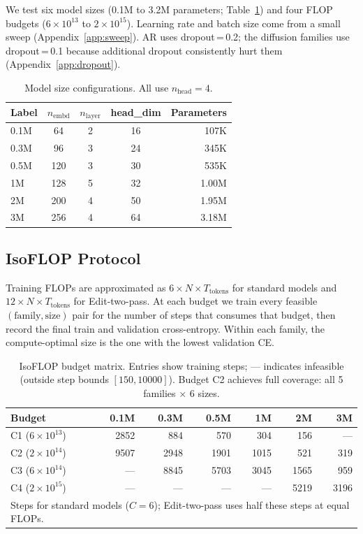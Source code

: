 \documentclass[11pt,a4paper]{article}
\begin{document}
We test six model sizes (0.1M to 3.2M parameters; Table~\ref{tab:sizes}) and four FLOP budgets ($6\!\times\!10^{13}$ to $2\!\times\!10^{15}$).
Learning rate and batch size come from a small sweep (Appendix~\ref{app:sweep}).
AR uses dropout\,=\,0.2; the diffusion families use dropout\,=\,0.1 because additional dropout consistently hurt them (Appendix~\ref{app:dropout}).

\begin{table}[H]
\centering
\caption{Model size configurations. All use $n_\text{head}=4$.}
\label{tab:sizes}
\begin{tabular}{lcccr}
\toprule
Label & $n_\text{embd}$ & $n_\text{layer}$ & head\_dim & Parameters \\
\midrule
0.1M & 64 & 2 & 16 & 107K \\
0.3M & 96 & 3 & 24 & 345K \\
0.5M & 120 & 3 & 30 & 535K \\
1M & 128 & 5 & 32 & 1.00M \\
2M & 200 & 4 & 50 & 1.95M \\
3M & 256 & 4 & 64 & 3.18M \\
\bottomrule
\end{tabular}
\end{table}

\subsection{IsoFLOP Protocol}

Training FLOPs are approximated as $6 \times N \times T_\text{tokens}$ for standard models and $12 \times N \times T_\text{tokens}$ for Edit-two-pass.
At each budget we train every feasible $(\text{family}, \text{size})$ pair for the number of steps that consumes that budget, then record the final train and validation cross-entropy.
Within each family, the compute-optimal size is the one with the lowest validation CE.

\begin{table}[H]
\centering
\caption{IsoFLOP budget matrix. Entries show training steps; --- indicates infeasible (outside step bounds $[150, 10000]$). Budget C2 achieves full coverage: all 5 families $\times$ 6 sizes.}
\label{tab:isoflop-matrix}
\begin{tabular}{lrrrrrr}
\toprule
Budget & 0.1M & 0.3M & 0.5M & 1M & 2M & 3M \\
\midrule
C1 ($6\!\times\!10^{13}$)  & 2852 & 884 & 570 & 304 & 156 & --- \\
C2 ($2\!\times\!10^{14}$)  & 9507 & 2948 & 1901 & 1015 & 521 & 319 \\
C3 ($6\!\times\!10^{14}$)  & --- & 8845 & 5703 & 3045 & 1565 & 959 \\
C4 ($2\!\times\!10^{15}$)  & --- & --- & --- & --- & 5219 & 3196 \\
\bottomrule
\multicolumn{7}{l}{\footnotesize Steps for standard models ($C\!=\!6$); Edit-two-pass uses half these steps at equal FLOPs.}
\end{tabular}
\end{table}
\end{document}
